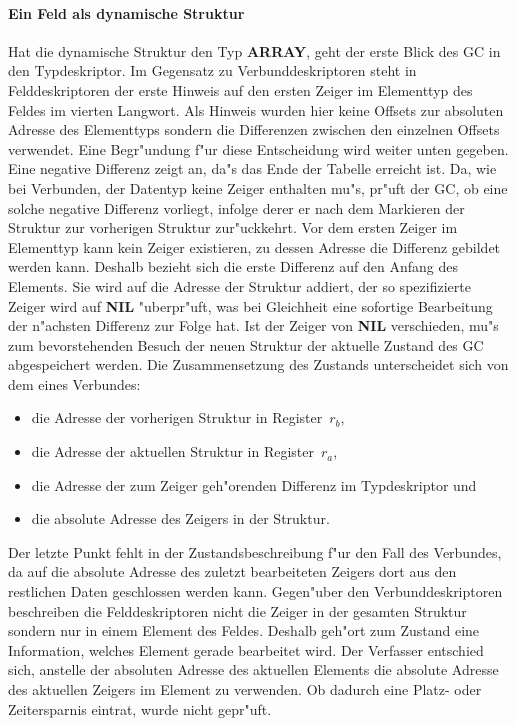 \paragraph{Ein Feld als dynamische Struktur}

Hat die dynamische Struktur den Typ {\bf ARRAY}, geht der erste Blick
des GC in den Typdeskriptor.
Im Gegensatz zu Verbunddeskriptoren steht in Felddeskriptoren der erste
Hinweis auf den ersten Zeiger im Elementtyp des Feldes im vierten Langwort.
Als Hinweis wurden hier keine Offsets zur absoluten Adresse des Elementtyps
sondern die Differenzen zwischen den einzelnen Offsets verwendet.
Eine Begr"undung f"ur diese Entscheidung wird weiter unten gegeben.
Eine negative Differenz zeigt an, da"s das Ende der Tabelle erreicht ist.
Da, wie bei Verbunden, der Datentyp keine Zeiger enthalten mu"s, pr"uft
der GC, ob eine solche negative Differenz vorliegt, infolge derer er
nach dem Markieren der Struktur zur vorherigen Struktur zur"uckkehrt.
Vor dem ersten Zeiger im Elementtyp kann kein Zeiger existieren, zu dessen
Adresse die Differenz gebildet werden kann.
Deshalb bezieht sich die erste Differenz auf den Anfang des Elements.
Sie wird auf die Adresse der Struktur addiert, der so spezifizierte Zeiger
wird auf {\bf NIL} "uberpr"uft, was bei Gleichheit eine sofortige Bearbeitung
der n"achsten Differenz zur Folge hat.
Ist der Zeiger von {\bf NIL} verschieden, mu"s zum bevorstehenden Besuch der
neuen Struktur der aktuelle Zustand des GC abgespeichert werden.
Die Zusammensetzung des Zustands unterscheidet sich von dem eines Verbundes:
\begin{itemize}
\item die Adresse der vorherigen Struktur in Register~$r_b$,
\item die Adresse der aktuellen Struktur in Register~$r_a$,
\item die Adresse der zum Zeiger geh"orenden Differenz im Typdeskriptor und
\item die absolute Adresse des Zeigers in der Struktur.
\end{itemize}
Der letzte Punkt fehlt in der Zustandsbeschreibung f"ur den Fall des Verbundes,
da auf die absolute Adresse des zuletzt bearbeiteten Zeigers dort aus den
restlichen Daten geschlossen werden kann.
Gegen"uber den Verbunddeskriptoren beschreiben die Felddeskriptoren nicht
die Zeiger in der gesamten Struktur sondern nur in einem Element des Feldes.
Deshalb geh"ort zum Zustand eine Information, welches Element gerade bearbeitet
wird.
Der Verfasser entschied sich, anstelle der absoluten Adresse des aktuellen
Elements die absolute Adresse des aktuellen Zeigers im Element zu verwenden.
Ob dadurch eine Platz- oder Zeitersparnis eintrat, wurde nicht gepr"uft.

